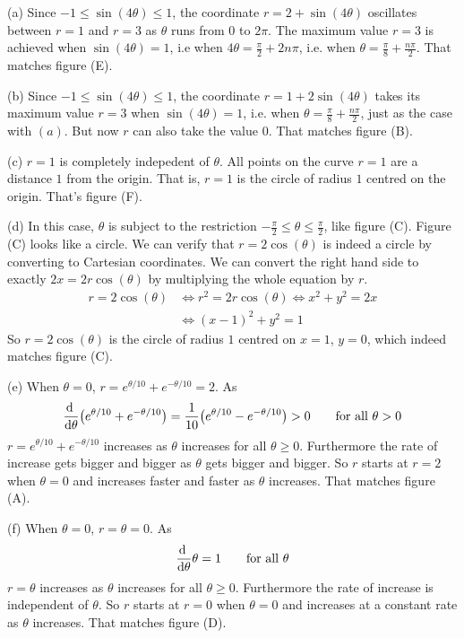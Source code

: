 \begin{solution}
(a) Since $-1\le \sin(4\theta)\le 1$, the coordinate $r=2+\sin(4\theta)$ oscillates between $r=1$ and $r=3$ as $\theta$ runs from $0$ to $2\pi$.
The maximum value $r=3$ is achieved when $\sin(4\theta)=1$, i.e when
$4\theta=\frac{\pi}{2} +2n\pi$, i.e. when $\theta=\frac{\pi}{8}+\frac{n\pi}{2}$.
That matches figure (E).

(b) Since $-1\le \sin(4\theta)\le 1$, the coordinate $r=1+2\sin(4\theta)$ takes its maximum value $r=3$ when $\sin(4\theta)=1$, i.e. when $\theta=\frac{\pi}{8}+\frac{n\pi}{2}$, just as the case with $(a)$. But now
$r$ can also take the value $0$. That matches figure (B).

(c) $r=1$ is completely indepedent of $\theta$. All points on the curve $r=1$
are a distance $1$ from the origin. That is, $r=1$ is the circle of radius $1$
centred on the origin. That's figure (F).

(d) In this case, $\theta$ is subject to the restriction 
$-\frac{\pi}{2}\le\theta\le\frac{\pi}{2}$, like figure (C).
Figure (C) looks like a circle. We can verify that $r=2\cos(\theta)$ is 
indeed a circle by converting to Cartesian coordinates. We can convert the right hand side to exactly $2x=2r\cos(\theta)$ by multiplying the 
whole equation by $r$.
\begin{align*}
r=2\cos(\theta)
&\iff r^2 =2r\cos(\theta)
\iff x^2+y^2=2x \\
&\iff (x-1)^2+y^2=1
\end{align*}
So $r=2\cos(\theta)$ is the circle of radius $1$ centred on $x=1$, $y=0$,
which indeed matches figure (C).

(e) When $\theta=0$, $r=e^{\theta/10}+e^{-\theta/10}=2$.
As 
\begin{equation*}
\diff{}{\theta}\big(e^{\theta/10}+e^{-\theta/10}\big)
    =\frac{1}{10}\big(e^{\theta/10}-e^{-\theta/10}\big)
    >0\qquad\text{for all }\theta > 0
\end{equation*}
$r=e^{\theta/10}+e^{-\theta/10}$ increases as $\theta$ increases for all
$\theta\ge 0$. Furthermore the rate of increase gets bigger and bigger as 
$\theta$ gets bigger and bigger. So $r$ starts at $r=2$ when $\theta=0$
and increases faster and faster as $\theta$ increases. That matches figure (A).

(f) When $\theta=0$, $r=\theta=0$.
As 
\begin{equation*}
\diff{}{\theta} \theta
    =1 \qquad\text{for all }\theta
\end{equation*}
$r=\theta$ increases as $\theta$ increases for all
$\theta\ge 0$. Furthermore the rate of increase is independent of $\theta$.
So $r$ starts at $r=0$ when $\theta=0$
and increases at a constant rate as $\theta$ increases.
That matches figure (D).

\end{solution}


